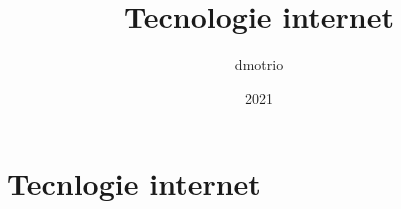 \documentclass{article}
\begin{document}
    \author{dmotrio}
    \title{Tecnologie internet}
    \date{2021}

    \maketitle
    \tableofcontents
    \listoffigures
    \listoftables

    \section{Tecnlogie internet}
    
    
    
    
    
    
    
    
    
    
    
    
    


    
    
    
    
    
    
    
    

    
\end{document}
